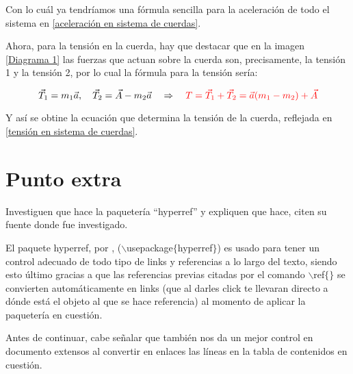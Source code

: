 \documentclass[12pt,letterpaper]{article}
\begin{document}
\begin{enumerate}
    Con lo cuál ya tendríamos una fórmula sencilla para la aceleración de todo el sistema en \ref{aceleración en sistema de cuerdas}.\newline

    Ahora, para la tensión en la cuerda, hay que destacar que en la imagen \ref{Diagrama 1} las fuerzas que actuan sobre la cuerda son, precisamente, la tensión 1 y la tensión 2, por lo cual la fórmula para la tensión sería:

        \begin{equation}
            \label{tensión en sistema de cuerdas}
            \vec{T}_{1}=m_{1}\vec{a},\quad
            \vec{T}_{2}=\vec{A}-m_{2}\vec{a}\quad
            \Rightarrow \quad
            \textcolor{red}{T=\vec{T}_{1}+\vec{T}_{2}=\vec{a}(m_{1}-m_{2})+\vec{A}}
        \end{equation}

    Y así se obtine la ecuación que determina la tensión de la cuerda, reflejada en \ref{tensión en sistema de cuerdas}.
    
\end{enumerate}
    
    \pagestyle{fancy}
            \fancyhf{}
            \rhead{\textcolor{white}{\thepage}}
            \cfoot{\textcolor{white}{Jordán Aarón Duarte Martínez}}

\section*{Punto extra}

Investiguen que hace la paquetería ``hyperref” y expliquen que hace, citen su fuente donde fue investigado.\newline

El paquete hyperref, por \cite{hyperref}, ($\backslash$usepackage$\{$hyperref$\}$) es usado para tener un control adecuado de todo tipo de links y referencias a lo largo del texto, siendo esto último gracias a que las referencias previas citadas por el comando $\backslash$ref$\{$$\}$ se convierten automáticamente en links (que al darles click te llevaran directo a dónde está el objeto al que se hace referencia) al momento de aplicar la paquetería en cuestión.\newline

Antes de continuar, cabe señalar que también nos da un mejor control en documento extensos al convertir en enlaces las líneas en la tabla de contenidos en cuestión.\newline
\end{document}
